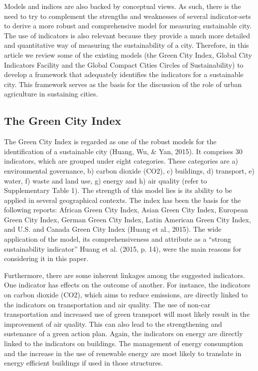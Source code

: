Models and indices are also backed by conceptual views. As such, there is the need to try to complement the strengths and weaknesses of several indicator-sets to derive a more robust and comprehensive model for measuring sustainable city. The use of indicators is also relevant because they provide a much more detailed and quantitative way of measuring the sustainability of a city. Therefore, in this article we review some of the existing models (the Green City Index, Global City Indicators Facility and the Global Compact Cities Circles of Sustainability) to develop a framework that adequately identifies the indicators for a sustainable city. This framework serves as the basis for the discussion of the role of urban agriculture in sustaining cities.

\subsection{The Green City Index}

The Green City Index is regarded as one of the robust models for the identification of a sustainable city (Huang, Wu, \& Yan, 2015). It comprises 30 indicators, which are grouped under eight categories. These categories are a) environmental governance, b) carbon dioxide (CO2), c) buildings, d) transport, e) water, f) waste and land use, g) energy and h) air quality (refer to Supplementary Table 1). The strength of this model lies is its ability to be applied in several geographical contexts. The index has been the basis for the following reports: African Green City Index, Asian Green City Index, European Green City Index, German Green City Index, Latin American Green City Index, and U.S. and Canada Green City Index (Huang et al., 2015). The wide application of the model, its comprehensiveness and attribute as a “strong sustainability indicator” Huang et al. (2015, p. 14), were the main reasons for considering it in this paper.

Furthermore, there are some inherent linkages among the suggested indicators. One indicator has effects on the outcome of another. For instance, the indicators on carbon dioxide (CO2), which aims to reduce emissions, are directly linked to the indicators on transportation and air quality. The use of non-car transportation and increased use of green transport will most likely result in the improvement of air quality. This can also lead to the strengthening and sustenance of a green action plan. Again, the indicators on energy are directly linked to the indicators on buildings. The management of energy consumption and the increase in the use of renewable energy are most likely to translate in
energy efficient buildings if used in those structures.

